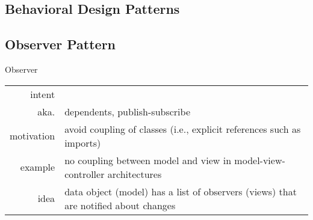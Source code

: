 \subsection{Behavioral Design Patterns}
\begin{frame}{\insertsubsection{} \mytitlesource{\gof}} %
	\centering{}
\end{frame}

\subsection{Observer Pattern}
\begin{frame}{\insertsubsection} %
	\begin{fancycolumns}
		\begin{definition}{Observer \mysource{\gofen}}
			\setlength\tabcolsep{1mm}
			\begin{tabularx}{\textwidth}{rX}				
				intent & \mycite{Define a one-to-many dependency between objects so that when one object changes state, all its dependents are notified and updated automatically.}\\
				aka. & dependents, publish-subscribe\\
				motivation & avoid coupling of classes (i.e., explicit references such as imports)\\
				example & no coupling between model and view in model-view-controller architectures\\
				idea & data object (model) has a list of observers (views) that are notified about changes
			\end{tabularx}
		\end{definition}
		\nextcolumn
	\end{fancycolumns}
\end{frame}


